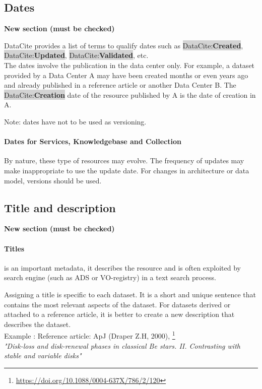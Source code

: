 \documentclass[11pt,a4paper]{ivoa}
\newcommand{\dataciteterm}[1]{\colorbox{lightgray}{DataCite:\textbf{#1}}}
\begin{document}
\subsection{Dates}
\label{sec:dates}
\textbf{\color{red}New section (must be checked)}


DataCite provides a list of terms to qualify dates such as \dataciteterm{Created}, \dataciteterm{Updated}, \dataciteterm{Validated}, etc.\\

The dates involve the publication in the data center only.
For example, a dataset provided by a Data Center A may have been created months or even years ago and already published in a reference article or another Data Center B. The \dataciteterm{Creation} date of the resource published by A is the date of creation in A.

Note: dates have not to be used as versioning.

\paragraph{Dates for Services, Knowledgebase and Collection}
By nature, these type of resources may evolve. The frequency of updates may make inappropriate to use the update date. For changes in architecture or data model, versions should be used.


\subsection{Title and description}
\label{sec:title}
\textbf{\color{red}New section (must be checked)}

\paragraph{Titles} is an important metadata, it describes the resource and is often exploited by search engine (such as ADS or VO-registry) in a text search process.


Assigning a title is specific to each dataset. 
It is a short and unique sentence that contains the most relevant aspects of the dataset.
For datasets derived or attached to a reference article, it is better to create a new description that describes the dataset.\\


Example : Reference article: ApJ (Draper Z.H, 2000), \footnote{\url{https://doi.org/10.1088/0004-637X/786/2/120}}\\
\textit{"Disk-loss and disk-renewal phases in classical Be stars. II. Contrasting with stable and variable disks"}
\end{document}
